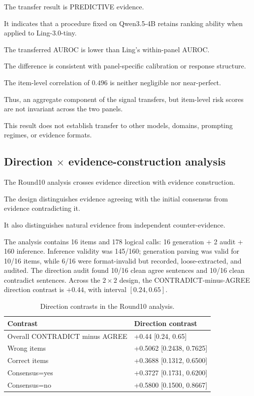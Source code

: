 \documentclass[11pt]{article}
\begin{document}
The transfer result is PREDICTIVE evidence.

It indicates that a procedure fixed on Qwen3.5-4B retains ranking ability when applied to Ling-3.0-tiny.

The transferred AUROC is lower than Ling's within-panel AUROC.

The difference is consistent with panel-specific calibration or response structure.

The item-level correlation of \(0.496\) is neither negligible nor near-perfect.

Thus, an aggregate component of the signal transfers, but item-level risk scores are not invariant across the two panels.

This result does not establish transfer to other models, domains, prompting regimes, or evidence formats.

\subsection{\texorpdfstring{Direction \(\times\) evidence-construction analysis}{Direction x evidence-construction analysis}}

The Round10 analysis crosses evidence direction with evidence construction.

The design distinguishes evidence agreeing with the initial consensus from evidence contradicting it.

It also distinguishes natural evidence from independent counter-evidence.

The analysis contains 16 items and 178 logical calls: 16 generation + 2 audit + 160 inference. Inference validity was 145/160; generation parsing was valid for 10/16 items, while 6/16 were format-invalid but recorded, loose-extracted, and audited. The direction audit found 10/16 clean agree sentences and 10/16 clean contradict sentences. Across the \(2\times2\) design, the CONTRADICT-minus-AGREE direction contrast is \(+0.44\), with interval \([0.24,0.65]\).

\begin{table}[t]
\centering
\small
\caption{Direction contrasts in the Round10 analysis.}
\label{tab:table5}
\begin{tabularx}{\columnwidth}{@{}>{\raggedright\arraybackslash}X>{\raggedleft\arraybackslash}X@{}}
\toprule
Contrast & Direction contrast \\
\midrule
Overall CONTRADICT minus AGREE & +0.44 [0.24, 0.65] \\
Wrong items & +0.5062 [0.2438, 0.7625] \\
Correct items & +0.3688 [0.1312, 0.6500] \\
Consensus=\allowbreak{}yes & +0.3727 [0.1731, 0.6200] \\
Consensus=\allowbreak{}no & +0.5800 [0.1500, 0.8667] \\
\bottomrule
\end{tabularx}
\end{table}
\end{document}
